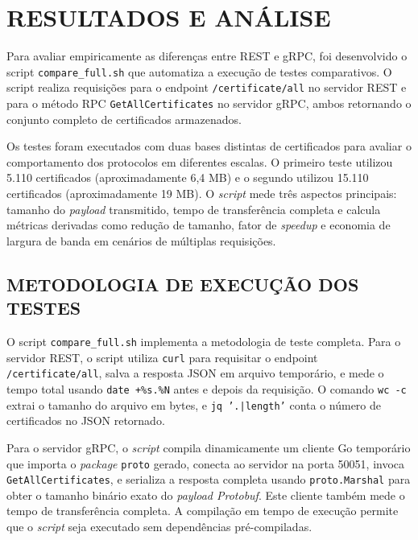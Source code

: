 \chapter{RESULTADOS E ANÁLISE} \label{cap:resultados}

Para avaliar empiricamente as diferenças entre REST e gRPC, foi desenvolvido o script \texttt{compare\_full.sh} que automatiza a execução de testes comparativos. O script realiza requisições para o endpoint \texttt{/certificate/all} no servidor REST e para o método RPC \texttt{GetAllCertificates} no servidor gRPC, ambos retornando o conjunto completo de certificados armazenados.

Os testes foram executados com duas bases distintas de certificados para avaliar o comportamento dos protocolos em diferentes escalas. O primeiro teste utilizou 5.110 certificados (aproximadamente 6,4 MB) e o segundo utilizou 15.110 certificados (aproximadamente 19 MB). O \textit{script} mede três aspectos principais: tamanho do \textit{payload} transmitido, tempo de transferência completa e calcula métricas derivadas como redução de tamanho, fator de \textit{speedup} e economia de largura de banda em cenários de múltiplas requisições.

\section{METODOLOGIA DE EXECUÇÃO DOS TESTES}\label{sec:metodologia-testes}

O script \texttt{compare\_full.sh} implementa a metodologia de teste completa. Para o servidor REST, o script utiliza \texttt{curl} para requisitar o endpoint \texttt{/certificate/all}, salva a resposta JSON em arquivo temporário, e mede o tempo total usando \texttt{date +\%s.\%N} antes e depois da requisição. O comando \texttt{wc -c} extrai o tamanho do arquivo em bytes, e \texttt{jq '.|length'} conta o número de certificados no JSON retornado.

Para o servidor gRPC, o \textit{script} compila dinamicamente um cliente Go temporário que importa o \textit{package} \texttt{proto} gerado, conecta ao servidor na porta 50051, invoca \texttt{GetAllCertificates}, e serializa a resposta completa usando \texttt{proto.Marshal} para obter o tamanho binário exato do \textit{payload Protobuf}. Este cliente também mede o tempo de transferência completa. A compilação em tempo de execução permite que o \textit{script} seja executado sem dependências pré-compiladas.

